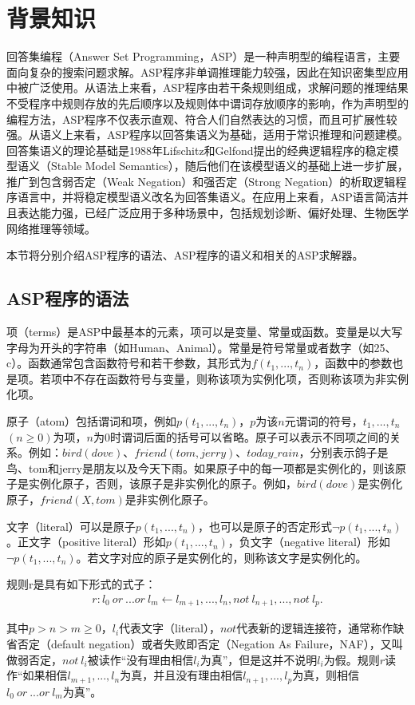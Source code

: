 \chapter{背景知识}
\label{chp:initialization}

回答集编程（Answer Set Programming，ASP）是一种声明型的编程语言，主要面向复杂的搜索问题求解。ASP程序非单调推理能力较强，因此在知识密集型应用中被广泛使用。从语法上来看，ASP程序由若干条规则组成，求解问题的推理结果不受程序中规则存放的先后顺序以及规则体中谓词存放顺序的影响，作为声明型的编程方法，ASP程序不仅表示直观、符合人们自然表达的习惯，而且可扩展性较强。从语义上来看，ASP程序以回答集语义为基础，适用于常识推理和问题建模。回答集语义的理论基础是1988年Lifschitz和Gelfond提出的经典逻辑程序的稳定模型语义（Stable Model Semantics）\cite{1992The}，随后他们在该模型语义的基础上进一步扩展，推广到包含弱否定（Weak Negation）和强否定（Strong Negation）的析取逻辑程序语言中，并将稳定模型语义改名为回答集语义。在应用上来看，ASP语言简洁并且表达能力强，已经广泛应用于多种场景中，包括规划诊断\cite{2002Answer}、偏好处理\cite{2003A}、生物医学网络推理\cite{2006Modelling}等领域。

本节将分别介绍ASP程序的语法、ASP程序的语义和相关的ASP求解器。
\section{ASP程序的语法}
项（terms）是ASP中最基本的元素，项可以是变量、常量或函数。变量是以大写字母为开头的字符串（如Human、Animal）。常量是符号常量或者数字（如25、c）。函数通常包含函数符号和若干参数，其形式为$f(t_{1},...,t_n )$，函数中的参数也是项。若项中不存在函数符号与变量，则称该项为实例化项，否则称该项为非实例化项。

原子（atom）包括谓词和项，例如$p(t_1,...,t_n )$，$p$为该$n$元谓词的符号，$t_{1},...,t_n$ $(n \geq 0)$为项，$n$为0时谓词后面的括号可以省略。原子可以表示不同项之间的关系。例如：$bird(dove)$、$friend(tom, jerry)$、$today\_rain$，分别表示鸽子是鸟、tom和jerry是朋友以及今天下雨。如果原子中的每一项都是实例化的，则该原子是实例化原子，否则，该原子是非实例化的原子。例如，$bird(dove)$是实例化原子，$friend(X,tom)$是非实例化原子。

文字（literal）可以是原子$p(t_{1},...,t_n )$，也可以是原子的否定形式$\neg p(t_{1},...,t_n )$。正文字（positive literal）形如$p(t_{1},...,t_n )$，负文字（negative literal）形如$\neg p(t_{1},...,t_n )$。若文字对应的原子是实例化的，则称该文字是实例化的。
\begin{definition}[规则]规则r是具有如下形式的式子：
    \begin{align}
        \label{rule:1}
        r: l_0\ or\ ... or\ l_m\leftarrow l_{m+1}, ..., l_n, not\ l_{n+1}, ..., not\ l_p.
    \end{align}
\end{definition}
其中$p > n > m \geq 0$，$l_i$代表文字（literal），$not$代表新的逻辑连接符，通常称作缺省否定（default negation）或者失败即否定（Negation As Failure，NAF），又叫做弱否定，$not \ l_i$被读作“没有理由相信$l_i$为真”，但是这并不说明$l_i$为假。规则$r$读作“如果相信$l_{m+1}, ..., l_n$为真，并且没有理由相信$l_{n+1}, ..., l_p$为真，则相信$l_0\ or\ ... or\ l_m$为真”。

